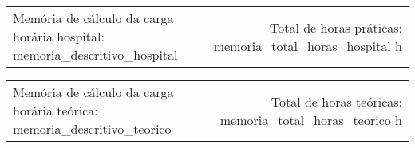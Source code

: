 {\fontsize{10pt}{12pt}\selectfont
\noindent
\begin{tabularx}{\linewidth}{@{}X r@{}}
Memória de cálculo da carga horária hospital:
{{ memoria_descritivo_hospital }}&
Total de horas práticas: {{ memoria_total_horas_hospital }}h\\
\end{tabularx}
\noindent
\begin{tabularx}{\linewidth}{@{}X r@{}}
Memória de cálculo da carga horária teórica: 
{{ memoria_descritivo_teorico }} &
Total de horas teóricas: {{ memoria_total_horas_teorico }}h
\end{tabularx}
}